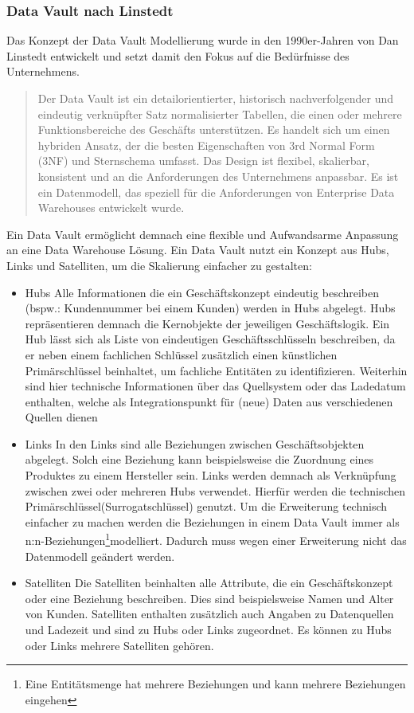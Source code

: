 \subsubsection{Data Vault nach Linstedt}\label{subsec:DataVault}
Das Konzept der Data Vault Modellierung wurde in den 1990er-Jahren von Dan Linstedt entwickelt und setzt damit den Fokus auf die Bedürfnisse des Unternehmens.
\begin{quote}
	\glqq Der Data Vault ist ein detailorientierter, historisch nachverfolgender und eindeutig verknüpfter Satz normalisierter Tabellen, die einen oder mehrere Funktionsbereiche des Geschäfts unterstützen. Es handelt sich um einen hybriden Ansatz, der die besten Eigenschaften von 3rd Normal Form (3NF) und Sternschema umfasst. Das Design ist flexibel, skalierbar, konsistent und an die Anforderungen des Unternehmens anpassbar. Es ist ein Datenmodell, das speziell für die Anforderungen von Enterprise Data Warehouses entwickelt wurde.\grqq\cite{DL:Data_Vault_Basics}\cite{DeepL}
\end{quote}
Ein Data Vault ermöglicht demnach eine flexible und Aufwandsarme Anpassung an eine Data Warehouse Lösung.
Ein Data Vault nutzt ein Konzept aus Hubs, Links und Satelliten, um die Skalierung einfacher zu gestalten:
\begin{itemize}
	\item {Hubs}\newline
		Alle Informationen die ein Geschäftskonzept eindeutig beschreiben (bspw.: Kundennummer bei einem Kunden) werden in Hubs abgelegt. Hubs repräsentieren demnach die Kernobjekte der jeweiligen Geschäftslogik. Ein Hub lässt sich als Liste von eindeutigen Geschäftsschlüsseln beschreiben, da er neben einem fachlichen Schlüssel zusätzlich einen künstlichen Primärschlüssel beinhaltet, um fachliche Entitäten zu identifizieren. Weiterhin sind hier technische Informationen über das Quellsystem oder das Ladedatum enthalten, welche als Integrationspunkt für (neue) Daten aus verschiedenen Quellen dienen
	\item {Links}\newline
		In den Links sind alle Beziehungen zwischen Geschäftsobjekten abgelegt. Solch eine Beziehung kann beispielsweise die Zuordnung eines Produktes zu einem Hersteller sein. Links werden demnach als Verknüpfung zwischen zwei oder mehreren Hubs verwendet. Hierfür werden die technischen Primärschlüssel(Surrogatschlüssel) genutzt. Um die Erweiterung technisch einfacher zu machen werden die Beziehungen in einem Data Vault immer als \glqq n:n-Beziehungen\footnote{Eine Entitätsmenge hat mehrere Beziehungen und kann mehrere Beziehungen eingehen}\grqq modelliert. Dadurch muss wegen einer Erweiterung nicht das Datenmodell geändert werden.
	\item {Satelliten}\newline
		Die Satelliten beinhalten alle Attribute, die ein Geschäftskonzept oder eine Beziehung beschreiben. Dies sind beispielsweise Namen und Alter von Kunden. Satelliten enthalten zusätzlich auch Angaben zu Datenquellen und Ladezeit und sind zu Hubs oder Links zugeordnet. Es können zu Hubs oder Links mehrere Satelliten gehören. 
\end{itemize}
